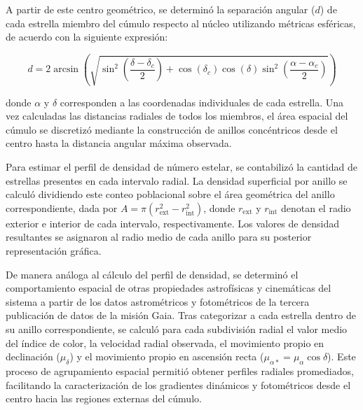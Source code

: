             A partir de este centro geométrico, se determinó la separación 
            angular ($d$) de cada estrella miembro del cúmulo respecto al núcleo 
            utilizando métricas esféricas, de acuerdo con la siguiente 
            expresión:

            $$d = 2 \arcsin \left( \sqrt{ \sin^2\left(\frac{\delta - \delta_c}
            {2}\right) + \cos(\delta_c) \cos(\delta) \sin^2\left(\frac{\alpha - 
            \alpha_c}{2}\right) } \right)$$

           donde $\alpha$ y $\delta$ corresponden a las coordenadas individuales 
           de cada estrella. Una vez calculadas las distancias radiales de todos 
           los miembros, el área espacial del cúmulo se discretizó mediante la 
           construcción de anillos concéntricos desde el centro hasta la 
           distancia angular máxima observada.

           Para estimar el perfil de densidad de número estelar, se contabilizó 
           la cantidad de estrellas presentes en cada intervalo radial. La 
           densidad superficial por anillo se calculó dividiendo este conteo 
           poblacional sobre el área geométrica del anillo correspondiente, dada 
           por $A = \pi \left(r_\text{ext}^2 - r_\text{int}^2\right)$, donde 
           $r_\text{ext}$ y $r_\text{int}$ denotan el radio exterior e interior 
           de cada intervalo, respectivamente. Los valores de densidad 
           resultantes se asignaron al radio medio de cada anillo para su 
           posterior representación gráfica.

           De manera análoga al cálculo del perfil de densidad, se determinó el 
           comportamiento espacial de otras propiedades astrofísicas y 
           cinemáticas del sistema a partir de los datos astrométricos y 
           fotométricos de la tercera publicación de datos de la misión Gaia. 
           Tras categorizar a cada estrella dentro de su anillo correspondiente, 
           se calculó para cada subdivisión radial el valor medio del índice de 
           color, la velocidad radial observada, el movimiento propio en 
           declinación ($\mu_\delta$) y el movimiento propio en ascensión recta 
           ($\mu_{\alpha*} = \mu_\alpha \cos\delta$). Este proceso de 
           agrupamiento espacial permitió obtener perfiles radiales promediados, 
           facilitando la caracterización de los gradientes dinámicos y 
           fotométricos desde el centro hacia las regiones externas del cúmulo.


